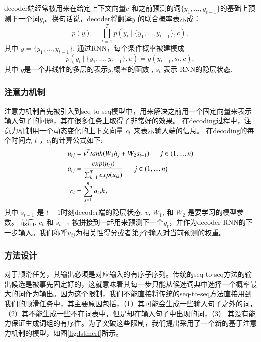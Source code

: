 decoder端经常被用来在给定上下文向量$c$ 和之前预测的词$\{y_1, ..., y_{t-1}\}$的基础上预测下一个词$y_t$。换句话说，decoder将翻译$y$ 的联合概率表示成：
\begin{equation}
p(y) = \prod_{t=1}^{T}p(y_{t} \ | \ \{y_1, ..., y_{t-1}\}, c),
\end{equation}
其中 $y = \{y_1, ...,y_{t-1}\}$. 通过RNN，每个条件概率被建模成
\begin{equation}
p(y_{t} \ | \ \{y_1, ..., y_{t-1}\}, c) = g(y_{t-1},s_t,c),
\end{equation}
其中  $g$是一个非线性的多层的表示$y_t$概率的函数 , $s_t$ 表示
RNN的隐层状态.



\subsubsection*{注意力机制}

注意力机制首先被引入到seq-to-seq模型中，用来解决之前用一个固定向量来表示输入句子的问题，其在很多任务上取得了非常好的效果。
在decoding过程中，注意力机制用一个动态变化的上下文向量 $c_t$ 来表示输入端的信息。
在decoding的每个时间点 $t$ ，$c_t$的计算公式如下:
\begin{equation}
\begin{split}
u_{tj} &= v^T tanh(W_1h_j + W_2s_{t-1}) \indent  j \in (1, ... ,n) \\
a_{tj} &= \frac{exp(u_{tj})}{\sum_{k=1}^{T}exp(u_{tk})} \indent  j \in (1, ... ,n)\\
c_t &= \sum_{j=1}^{n}a_{tj}h_j
\end{split}
\end{equation}
其中 $s_{t-1}$ 是 $t-1$时刻decoder端的隐层状态. $v$, $W_1$, 和 $W_2$ 是要学习的模型参数。
最后, $c_t$ 和 $s_{t-1}$ 被拼接到一起用来预测下一个$y_t$，并作为decoder RNN的下一步输入。我们称呼$u_{tj}$为相关性得分或者第$j$个输入对当前预测的权重。

\subsubsection{方法设计}

对于顺滑任务，其输出必须是对应输入的有序子序列。传统的seq-to-seq方法的输出候选是被事先固定好的，这就意味着其每一步只能从候选词典中选择一个概率最大的词作为输出。因为这个限制，我们不能直接将传统的seq-to-seq方法直接用到我们的顺滑任务中，其主要原因包括，（1）其可能会生成一些输入句子之外的词， （2）其不能生成一些不在词表中，但是却在输入句子中出现的词，（3） 其没有能力保证生成词组的有序性。为了突破这些限制，我们提出采用了一个新的基于注意力机制的模型，如图\ref{fig:lstmcrf}所示。

